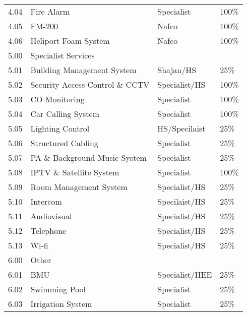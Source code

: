 \begin{longtable}{llll}
4.04	&Fire Alarm		&Specialist&100\%\\
4.05	&FM-200		&Nafco&100\% \\
4.06	&Heliport Foam System	 &Nafco&100\% \\	
\midrule
5.00	&Specialist Services		&&\\
5.01	&Building Management System	&Shajan/HS&25\%\\	
5.02	&Security Access Control \& CCTV	&Specialist/HS&100\%\\	
5.03	&CO Monitoring		&Specialist&100\%\\
5.04	&Car Calling System		&Specialist&100\%\\
5.05	&Lighting Control		&HS/Specilaist&25\%\\
5.06	&Structured Cabling		&Specialist&25\%\\
5.07	&PA \& Background Music System &Specialist&25\%\\		
5.08	&IPTV \& Satellite System	&Specialist&100\%\\	
5.09	&Room Management System	&Specialist/HS&25\%\\
5.10 &Intercom                 &Specilaist/HS&25\%\\
5.11 &Audiovisual              &Specialist/HS&25\%\\
5.12 &Telephone                &Specialist/HS&25\%\\
5.13 &Wi-fi                    &Specialist/HS&25\%\\
\midrule
6.00 &Other                    &			&\\
6.01 & BMU                     &Specialist/HEE &25\%\\
6.02 & Swimming Pool           &Specialist     &25\%\\
6.03 &Irrigation System        &Specialist     &25\%\\
\bottomrule
\end{longtable}

